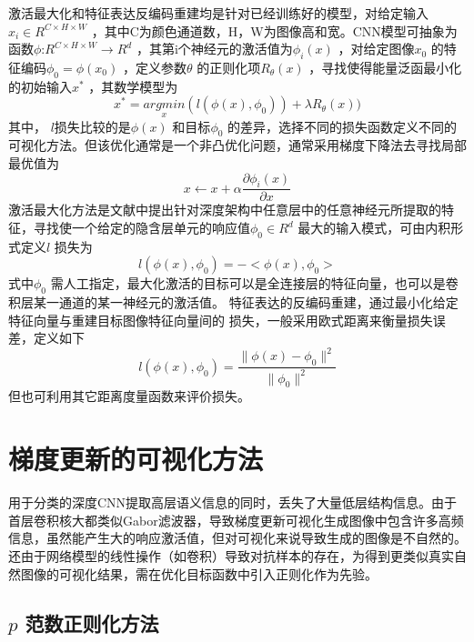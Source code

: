 激活最大化和特征表达反编码重建均是针对已经训练好的模型，对给定输入$x_{i}\in R^{C\times H\times W}$ ，其中C为颜色通道数，H，W为图像高和宽。CNN模型可抽象为函数$\phi$:$R^{C\times H\times W}\rightarrow R^d$ ，其第i个神经元的激活值为$\phi _{i}(x)$ ，对给定图像$x_{0}$ 的特征编码$\phi _{0}=\phi (x_{0})$ ，定义参数$\theta$ 的正则化项$R_{\theta}(x)$ ，寻找使得能量泛函最小化的初始输入$x^*$ ，其数学模型为
\begin{equation} \label{eq:ch04_01}
     x^*=\underset{x}{argmin} (l(\phi (x),\phi _{0})) + \lambda R_\theta(x))
\end{equation}
其中， $l$损失比较的是$\phi (x)$ 和目标$\phi_{0}$ 的差异，选择不同的损失函数定义不同的可视化方法。但该优化通常是一个非凸优化问题，通常采用梯度下降法去寻找局部最优值为
\begin{equation} \label{eq:ch04_02}
     x \leftarrow x+ \alpha \frac{\partial \phi _{i}(x)}{\partial x}
\end{equation}
激活最大化方法是文献中提出针对深度架构中任意层中的任意神经元所提取的特征，寻找使一个给定的隐含层单元的响应值$\phi _{0}\in R^d$ 最大的输入模式，可由内积形式定义$l$ 损失为
\begin{equation} \label{eq:ch04_03}
     l(\phi (x),\phi_{0}) =-<\phi (x),\phi _{0}>
\end{equation}
  式中$\phi_{0}$ 需人工指定，最大化激活的目标可以是全连接层的特征向量，也可以是卷积层某一通道的某一神经元的激活值。
特征表达的反编码重建，通过最小化给定特征向量与重建目标图像特征向量间的 损失，一般采用欧式距离来衡量损失误差，定义如下 
\begin{equation} \label{eq:ch04_04}
     l(\phi (x),\phi _{0}) = \frac{\parallel\phi (x)-\phi _{0} \parallel^2 }{\parallel \phi _{0} \parallel^2 }
\end{equation} 
但也可利用其它距离度量函数来评价损失。

\section{梯度更新的可视化方法}
 
   用于分类的深度CNN提取高层语义信息的同时，丢失了大量低层结构信息。由于首层卷积核大都类似Gabor滤波器，导致梯度更新可视化生成图像中包含许多高频信息，虽然能产生大的响应激活值，但对可视化来说导致生成的图像是不自然的。还由于网络模型的线性操作（如卷积）导致对抗样本\citep{Goodfellow2014}的存在，为得到更类似真实自然图像的可视化结果，需在优化目标函数中引入正则化作为先验。
\subsection{$p$ 范数正则化方法} 

